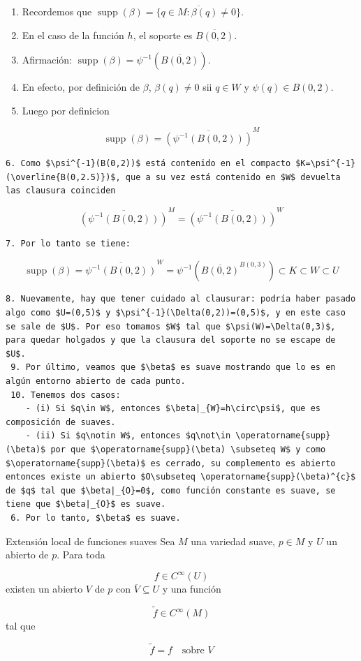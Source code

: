 \begin{bookproof}{}
\begin{itemize}
\begin{enumerate}
\item Recordemos que $\operatorname{supp}(\beta)=\overline{\{q\in M:\beta(q)\neq 0\}}$.
\item En el caso de la función $h$, el soporte es $\overline{B(0,2)}$.
\item Afirmación: $\operatorname{supp}(\beta)=\psi^{-1}(\overline{B(0,2)})$.
\item En efecto, por definición de $\beta$, $\beta(q)\neq 0$ sii $q\in W$ y $\psi(q)\in B(0,2)$.
\item Luego por definicion
\end{enumerate}
\end{itemize}
\[
\operatorname{supp}(\beta)=\overline{(\psi^{-1}(B(0,2)))}^{M}
\]
\begin{Verbatim}[fontsize=\small]
 6. Como $\psi^{-1}(B(0,2))$ está contenido en el compacto $K=\psi^{-1}(\overline{B(0,2.5)})$, que a su vez está contenido en $W$ devuelta las clausura coinciden 
\end{Verbatim}
\[
\overline{(\psi^{-1}(B(0,2)))}^{M}=\overline{(\psi^{-1}(B(0,2)))}^{W}
\]
\begin{Verbatim}[fontsize=\small]
 7. Por lo tanto se tiene: 
\end{Verbatim}
\[
\operatorname{supp}(\beta)=\overline{\psi ^{-1}(B(0,2)) }^{W}=\psi^{-1}(\overline{B(0,2)}^{B(0,3)}) \subset K\subset W\subset U
\]
\begin{Verbatim}[fontsize=\small]
 8. Nuevamente, hay que tener cuidado al clausurar: podría haber pasado algo como $U=(0,5)$ y $\psi^{-1}(\Delta(0,2))=(0,5)$, y en este caso se sale de $U$. Por eso tomamos $W$ tal que $\psi(W)=\Delta(0,3)$, para quedar holgados y que la clausura del soporte no se escape de $U$.  
 9. Por último, veamos que $\beta$ es suave mostrando que lo es en algún entorno abierto de cada punto.  
 10. Tenemos dos casos:  
 	- (i) Si $q\in W$, entonces $\beta|_{W}=h\circ\psi$, que es composición de suaves.
 	- (ii) Si $q\notin W$, entonces $q\not\in \operatorname{supp}(\beta)$ por que $\operatorname{supp}(\beta) \subseteq W$ y como $\operatorname{supp}(\beta)$ es cerrado, su complemento es abierto entonces existe un abierto $O\subseteq \operatorname{supp}(\beta)^{c}$ de $q$ tal que $\beta|_{O}=0$, como función constante es suave, se tiene que $\beta|_{O}$ es suave. 
 6. Por lo tanto, $\beta$ es suave.
\end{Verbatim}
\bookqed
\end{bookproof}
\begin{booklemma}{Extensión local de funciones suaves}
Sea $M$ una variedad suave, $p\in M$ y $U$ un abierto de $p$. Para toda

\[
f\in C^\infty(U)
\]
existen un abierto $V$ de $p$ con $\overline V\subseteq U$ y una función

\[
\widetilde f\in C^\infty(M)
\]
tal que

\[
\widetilde f=f\quad\text{sobre }V
\]
\end{booklemma}
